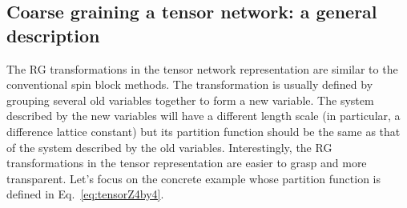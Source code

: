 \documentclass[aps,prb,reprint,superscriptaddress,floatfix]{revtex4-2}
\begin{document}
\subsection{Coarse graining a tensor network: a general
description\label{cgTN}} The RG transformations in the tensor network
representation are similar to the conventional spin block methods. The
transformation is usually defined by grouping several old variables
together to form a new variable. The system described by the new
variables will have a different length scale (in particular, a
difference lattice constant) but its partition function should be the
same as that of the system described by the old variables.
Interestingly, the RG transformations in the tensor representation are
easier to grasp and more transparent.  Let's focus on the concrete
example whose partition function is defined in
Eq.~\eqref{eq:tensorZ4by4}. 
%
\end{document}
